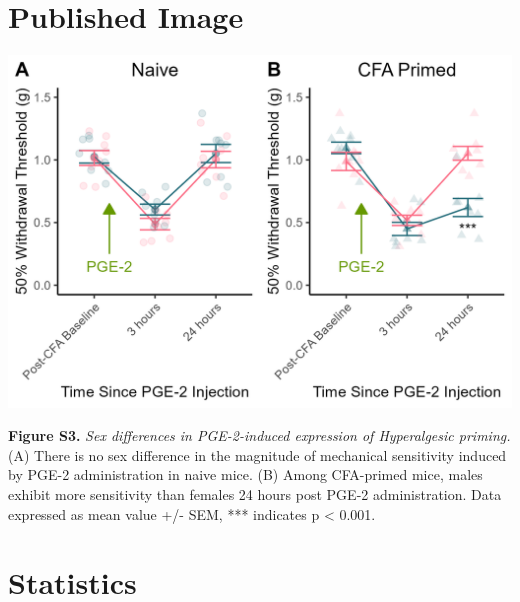 \documentclass[
]{book}
\newenvironment{Shaded}{\begin{snugshade}}{\end{snugshade}}
\newcommand{\FunctionTok}[1]{\textcolor[rgb]{0.00,0.00,0.00}{#1}}
\newcommand{\NormalTok}[1]{#1}
\newcommand{\OtherTok}[1]{\textcolor[rgb]{0.56,0.35,0.01}{#1}}
\newcommand{\SpecialCharTok}[1]{\textcolor[rgb]{0.00,0.00,0.00}{#1}}
\newcommand{\StringTok}[1]{\textcolor[rgb]{0.31,0.60,0.02}{#1}}
\begin{document}
\hypertarget{published-image-7}{%
\section*{Published Image}\label{published-image-7}}

\begin{center}\includegraphics[width=20.83in]{Figs/S3_MvF_PGE2} \end{center}

\textbf{Figure S3.} \emph{Sex differences in PGE-2-induced expression of Hyperalgesic priming.} (A) There is no sex difference in the magnitude of mechanical sensitivity induced by PGE-2 administration in naive mice. (B) Among CFA-primed mice, males exhibit more sensitivity than females 24 hours post PGE-2 administration. Data expressed as mean value +/- SEM, *** indicates p \textless{} 0.001.

\hypertarget{statistics-4}{%
\section*{Statistics}\label{statistics-4}}

\begin{Shaded}
\end{Shaded}
\end{document}
